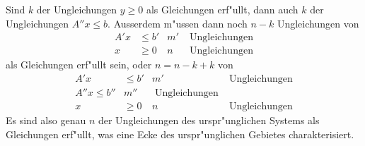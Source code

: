 Sind $k$ der Ungleichungen $y\ge 0$ als Gleichungen erf"ullt,
dann auch $k$ der Ungleichungen $A''x\le b$. Ausserdem
m"ussen dann noch $n-k$ Ungleichungen von
\begin{align*}
A'x&\le b' & m'&\;\text{Ungleichungen}\\
x  &\ge 0  &  n&\;\text{Ungleichungen}
\end{align*}
als Gleichungen erf"ullt sein, oder $n=n-k+k$ von
\begin{align*}
A'x&\le b' & m'&\;\text{Ungleichungen}\\
A''x\le b''&m''&\;\text{Ungleichungen}\\
x  &\ge 0  &  n&\;\text{Ungleichungen}
\end{align*}
Es sind also genau $n$ der Ungleichungen des urspr"unglichen Systems
als Gleichungen erf"ullt, was eine Ecke des urspr"unglichen Gebietes
charakterisiert.

